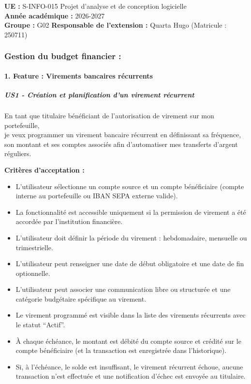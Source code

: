 \textbf{UE :} S-INFO-015 Projet d'analyse et de conception logicielle\\
\textbf{Année académique :} 2026-2027\\
\textbf{Groupe :} G02 \textbf{Responsable de l'extension :} Quarta Hugo
(Matricule : 250711)

\hypertarget{gestion-du-budget-financier}{%
\subsubsection{Gestion du budget financier
:}\label{gestion-du-budget-financier}}

\hypertarget{feature-virements-bancaires-ruxe9currents}{%
\paragraph{1. Feature : Virements bancaires
récurrents}\label{feature-virements-bancaires-ruxe9currents}}

\hypertarget{us1---cruxe9ation-et-planification-dun-virement-ruxe9current}{%
\subparagraph{US1 - Création et planification d'un virement
récurrent}\label{us1---cruxe9ation-et-planification-dun-virement-ruxe9current}}

En tant que titulaire bénéficiant de l'autorisation de virement sur mon
portefeuille,\\
je veux programmer un virement bancaire récurrent en définissant sa
fréquence, son montant et ses comptes associés afin d'automatiser mes
transferts d'argent réguliers.

\textbf{Critères d'acceptation :}

\begin{itemize}
\tightlist
\item
  L'utilisateur sélectionne un compte source et un compte bénéficiaire
  (compte interne au portefeuille ou IBAN SEPA externe valide).
\item
  La fonctionnalité est accessible uniquement si la permission de
  virement a été accordée par l'institution financière.
\item
  L'utilisateur doit définir la période du virement : hebdomadaire,
  mensuelle ou trimestrielle.
\item
  L'utilisateur peut renseigner une date de début obligatoire et une
  date de fin optionnelle.
\item
  L'utilisateur peut associer une communication libre ou structurée et
  une catégorie budgétaire spécifique au virement.
\item
  Le virement programmé est visible dans la liste des virements
  récurrents avec le statut ``Actif''.
\item
  À chaque échéance, le montant est débité du compte source et crédité
  sur le compte bénéficiaire (et la transaction est enregistrée dans
  l'historique).
\item
  Si, à l'échéance, le solde est insuffisant, le virement récurrent
  échoue, aucune transaction n'est effectuée et une notification d'échec
  est envoyée au titulaire.
\end{itemize}

